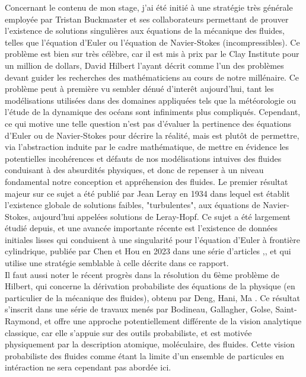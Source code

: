 \documentclass[11pt,a4paper]{article}
\begin{document}
Concernant le contenu de mon stage, j'ai été initié à une stratégie très générale employée par Tristan Buckmaster et ses collaborateurs permettant de prouver l'existence de solutions singulières aux équations de la mécanique des fluides, telles que l'équation d'Euler ou l'équation de Navier-Stokes (incompressibles). Ce problème est bien sur très célèbre, car il est mis à prix par le Clay Institute pour un million de dollars, David Hilbert l'ayant décrit comme l'un des problèmes devant guider les recherches des mathématiciens au cours de notre millénaire. Ce problème peut à première vu sembler dénué d'interêt aujourd'hui, tant les modélisations utilisées dans des domaines appliquées tels que la météorologie ou l'étude de la dynamique des océans sont infiniments plus compliqués. Cependant, ce qui motive une telle question n'est pas d'évaluer la pertinence des équations d'Euler ou de Navier-Stokes pour décrire la réalité, mais est plutôt de permettre, via l'abstraction induite par le cadre mathématique, de mettre en évidence les potentielles incohérences et défauts de nos modélisations intuives des fluides conduisant à des absurdités physiques, et donc de repenser à un niveau fondamental notre conception et appréhension des fluides. Le premier résultat majeur sur ce sujet a été publié par Jean Leray en 1934 \cite{leray1934} dans lequel est établit l'existence globale de solutions faibles, "turbulentes", aux équations de Navier-Stokes, aujourd'hui appelées solutions de Leray-Hopf. Ce sujet a été largement étudié depuis, et une avancée importante récente est l'existence de données initiales lisses qui conduisent à une singularité pour l'équation d'Euler à frontière cylindrique, publiée par Chen et Hou en 2023 dans une série d'articles \cite{chen_hou1},\cite{chen_hou2}, et qui utilise une stratégie semblable à celle décrite dans ce rapport. \\
Il faut aussi noter le récent progrès dans la résolution du 6ème problème de Hilbert, qui concerne la dérivation probabiliste des équations de la physique (en particulier de la mécanique des fluides), obtenu par Deng, Hani, Ma \cite{deng_hani_ma_2025_hilbert6}. Ce résultat s'inscrit dans une série de travaux menés par Bodineau, Gallagher, Golse, Saint-Raymond, et offre une approche potentiellement différente de la vision analytique classique, car elle s'appuie sur des outils probabiliste, et est motivée physiquement par la description atomique, moléculaire, des fluides. Cette vision probabiliste des fluides comme étant la limite d'un ensemble de particules en intéraction ne sera cependant pas abordée ici. \\
\end{document}
